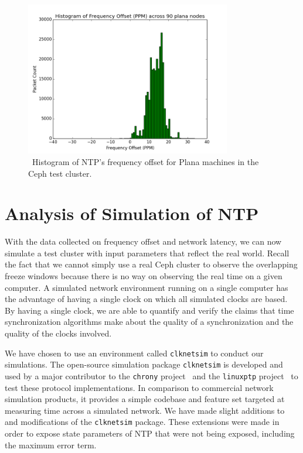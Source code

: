 \begin{figure}[h]
  \centering
  \caption{~Histogram of NTP's frequency offset for Plana machines in the Ceph test cluster.}
  \label{fig:plana-hist}
  \includegraphics[width=0.8\textwidth]{plana-freq-offset.png}
\end{figure}






        



\section{Analysis of Simulation of NTP}

With the data collected on frequency offset and network latency, we can 
now simulate a test cluster with input parameters that reflect the 
real world. Recall the fact that we cannot simply use a real Ceph
cluster to observe the overlapping freeze windows because there is no
way on observing the real time on a given computer. A
simulated network environment running on a single computer has the
advantage of having a single clock on which all simulated clocks are
based. By having a single clock, we are able to quantify and verify
the claims that time synchronization algorithms make about the quality
of a synchronization and the quality of the clocks involved.

We have chosen to use an environment called \texttt{clknetsim} %
to conduct our simulations. The open-source simulation package 
\texttt{clknetsim} is 
developed and used by a major contributor to the \texttt{chrony}
project~\citep{chrony} and the \texttt{linuxptp} project~\citep{linuxptp}
to test these protocol implementations. In
comparison to commercial network simulation products, it provides a 
simple codebase and feature set targeted at measuring 
time across a simulated network. We have made slight additions to and
modifications of the \texttt{clknetsim} package. These extensions were made in 
order to expose state parameters of NTP that were not being exposed, 
including the maximum error term.

